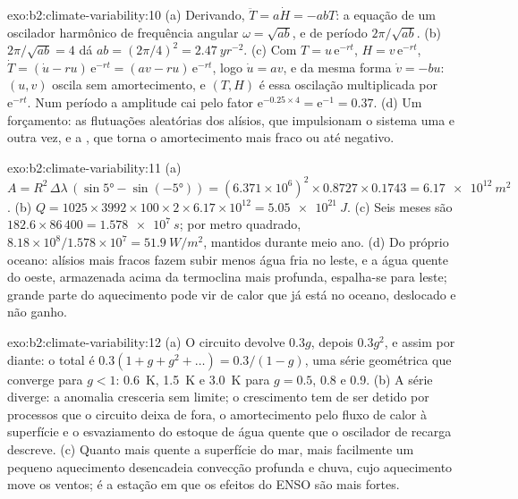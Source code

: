 \begin{solution}{exo:b2:climate-variability:10}
(a) Derivando, $\ddot T = a\dot H = -abT$: a equação de um oscilador harmônico de frequência
angular $\omega = \sqrt{ab}$, e de período $2\pi/\sqrt{ab}$. (b) $2\pi/\sqrt{ab} = 4$ dá $ab =
(2\pi/4)^2 = \qty{2.47}{yr^{-2}}$. (c) Com $T = u\,\mathrm{e}^{-rt}$, $H = v\,\mathrm{e}^{-rt}$,
$\dot T = (\dot u - ru)\,\mathrm{e}^{-rt} = (av - ru)\,\mathrm{e}^{-rt}$, logo $\dot u = av$, e
da mesma forma $\dot v = -bu$: $(u, v)$ oscila sem amortecimento, e $(T, H)$ é essa oscilação
multiplicada por $\mathrm{e}^{-rt}$. Num período a amplitude cai pelo fator $\mathrm{e}^{-0.25 \times
4} = \mathrm{e}^{-1} = 0.37$. (d) Um forçamento: as flutuações aleatórias dos alísios, que
impulsionam o sistema uma e outra vez, e a , que torna o amortecimento mais fraco ou
até negativo.
\end{solution}

\begin{solution}{exo:b2:climate-variability:11}
(a) $A = R^2 \,\Delta\lambda\,(\sin\ang{5} - \sin(\ang{-5})) = (6.371 \times 10^6)^2 \times 0.8727
\times 0.1743 = \qty{6.17e12}{m^2}$. (b) $Q = 1025 \times 3992 \times 100 \times 2 \times 6.17
\times 10^{12} = \qty{5.05e21}{J}$. (c) Seis meses são $182.6 \times 86\,400 = \qty{1.578e7}{s}$;
por metro quadrado, $8.18 \times 10^8/1.578 \times 10^7 = \qty{51.9}{W/m^2}$, mantidos durante meio
ano. (d) Do próprio oceano: alísios mais fracos fazem subir menos água fria no leste, e a água quente
do oeste, armazenada acima da termoclina mais profunda, espalha-se para leste; grande parte do aquecimento
pode vir de calor que já está no oceano, deslocado e não ganho.
\end{solution}

\begin{solution}{exo:b2:climate-variability:12}
(a) O circuito devolve $0.3g$, depois $0.3g^2$, e assim por diante: o total é $0.3(1 + g + g^2 + \dots) =
0.3/(1 - g)$, uma série geométrica que converge para $g < 1$: \qty{0.6}{K}, \qty{1.5}{K} e
\qty{3.0}{K} para $g = 0.5$, 0.8 e 0.9. (b) A série diverge: a anomalia cresceria sem
limite; o crescimento tem de ser detido por processos que o circuito deixa de fora, o amortecimento pelo fluxo de calor
à superfície e o esvaziamento do estoque de água quente que o oscilador de recarga descreve. (c)
Quanto mais quente a superfície do mar, mais facilmente um pequeno aquecimento desencadeia convecção profunda e chuva,
cujo aquecimento move os ventos; é a estação em que os efeitos do ENSO são mais fortes.
\end{solution}

